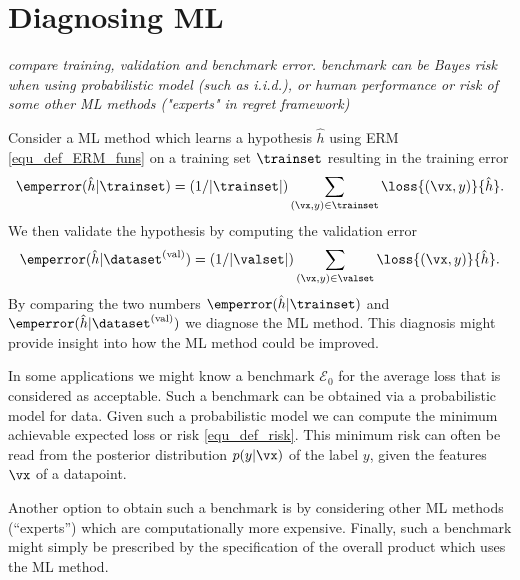 \documentclass[12pt]{report}
\begin{document}
\section{Diagnosing ML} 
\label{equ_diagnosis_ML}
\emph{compare training, validation and benchmark error. benchmark can 
be Bayes risk when using probabilistic model (such as i.i.d.), or human 
performance or risk of some other ML methods ("experts" in regret framework)  }

Consider a ML method which learns a hypothesis $\hat{h}$ using ERM 
\eqref{equ_def_ERM_funs} on a training set $\trainset$ resulting in the 
training error 
$$\emperror(\hat{h}| \trainset) =  (1/|\trainset|) \sum_{(\vx,y) \in \trainset} \loss{(\vx,y)}{\hat{h}}.$$ 
We then validate the hypothesis by computing the validation error  
$$\emperror(\hat{h}| \dataset^{(\rm val)}) = (1/|\valset|) \sum_{(\vx,y) \in \valset} \loss{(\vx,y)}{\hat{h}}.$$ 
By comparing the two numbers $\emperror(\hat{h}| \trainset)$ and $\emperror(\hat{h}| \dataset^{(\rm val)})$ 
we diagnose the ML method. This diagnosis might provide insight into how 
the ML method could be improved. 

In some applications we might know a benchmark $\mathcal{E}_{0}$ 
for the average loss that is considered as acceptable. Such a benchmark 
can be obtained via a probabilistic model for data. Given such a probabilistic 
model we can compute the minimum achievable expected loss or risk \eqref{equ_def_risk}. 
This minimum risk can often be read from the posterior distribution $p(y|\vx)$ of 
the label $y$, given the features $\vx$ of a datapoint. 

Another option to obtain such a benchmark is by considering other ML methods 
(``experts'') which are computationally more expensive. Finally, such a benchmark 
might simply be prescribed by the specification of the overall product which uses 
the ML method. 
\end{document}
